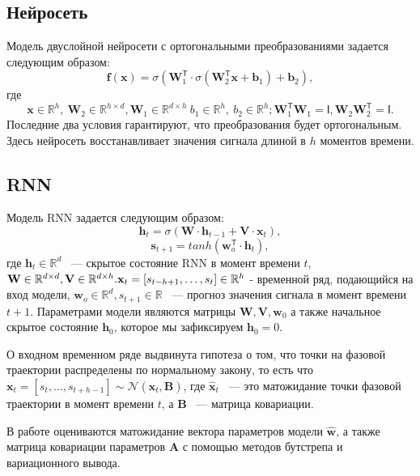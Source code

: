 \documentclass[12pt, twoside]{article}
\begin{document}
\subsection{Нейросеть}
Модель двуслойной нейросети с ортогональными преобразованиями задается следующим образом: \[\mathbf{f}(\mathbf{x}) = \sigma(\mathbf{W}_1^{\mathsf{T}}\cdot \sigma(\mathbf{W}_2^{\mathsf{T}}\mathbf{x} + \mathbf{b}_1) + \mathbf{b}_2),\] где  \[\mathbf{x} \in \mathbb{R}^{h}, \ \mathbf{W}_2 \in \mathbb{R}^{h \times d}, \mathbf{W}_1 \in \mathbb{R}^{d \times h} \ b_1 \in \mathbb{R}^h, \ b_2 \in \mathbb{R}^{h}; \mathbf{W}_1^{\mathsf{T}}\mathbf{W}_1=\mathsf{I}, \mathbf{W}_2\mathbf{W}_2^{\mathsf{T}}=\mathsf{I}.\] Последние два условия гарантируют, что преобразования будет ортогональным. Здесь нейросеть восстанавливает значения сигнала длиной в $h$ моментов времени.

\subsection{RNN}
Модель RNN задается следующим образом: \[ \mathbf{h}_t = \sigma(\mathbf{W} \cdot \mathbf{h}_{t-1} + \mathbf{V} \cdot \mathbf{x}_t),\]
\[ \mathbf{s}_{t+1} = tanh(\mathbf{w}_o^{\mathsf{T}} \cdot \mathbf{h}_t), \] где $\mathbf{h}_{t} \in \mathbb{R}^{d}$ ~--- скрытое состояние RNN в момент времени $t$, $\mathbf{W} \in \mathbb{R}^{d \times d}, \mathbf{V} \in \mathbb{R}^{d \times h}. \\
\mathbf{x}_t = [s_{t - h + 1}, \dots, s_{t}] \in \mathbb{R}^h$ - временной ряд, подающийся на вход модели, $\mathbf{w}_o \in \mathbb{R}^{d}, s_{t+1} \in \mathbb{R}$ ~--- прогноз значения сигнала в момент времени $t+1$. Параметрами модели являются матрицы $\mathbf{W}, \mathbf{V}, \mathbf{w}_0$ а также начальное скрытое состояние $\mathbf{h}_0$, которое мы зафиксируем $\mathbf{h}_0=0$.

О входном временном ряде выдвинута гипотеза о том, что точки на фазовой траектории распределены по нормальному закону, то есть что $\mathbf{x}_t = [s_t, \dots, s_{t + h - 1}] \sim \mathcal{N}(\hat{\mathbf{x}}_t, \mathbf{B})$, где $\hat{\mathbf{x}}_t$ ~--- это матожидание точки фазовой траектории в момент времени $t$, а $\mathbf{B}$ ~--- матрица ковариации. 


В работе оцениваются матожидание вектора параметров модели $\hat{\mathbf{w}}$, а также матрица ковариации параметров $\mathbf{A}$ с помощью методов бутстрепа и вариационного вывода.
\end{document}
